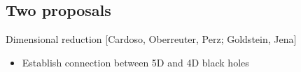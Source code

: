 \documentclass{beamer}
\begin{document}
\subsection{Two proposals}

\begin{frame}{Dimensional reduction {\footnotesize [Cardoso, Oberreuter, Perz; Goldstein, Jena] }}

  \begin{itemize}
  \item Establish connection between 5D and 4D black holes
  \end{itemize}
  \begin{figure}
  \centering
  \end{figure}
    
  
\end{frame}
\end{document}
